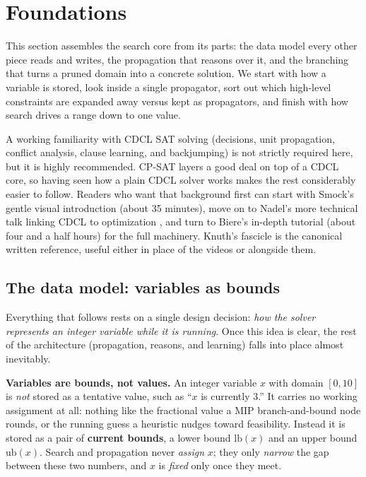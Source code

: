 \section{Foundations}\label{part:foundations}

This section assembles the search core from its parts: the data model every other
piece reads and writes, the propagation that reasons over it, and the branching
that turns a pruned domain into a concrete solution. We start with how a variable
is stored, look inside a single propagator, sort out which high-level constraints
are expanded away versus kept as propagators, and finish with how search drives a
range down to one value.

\begin{platypusbook}[htb]
A working familiarity with CDCL SAT solving (decisions, unit propagation,
conflict analysis, clause learning, and backjumping) is not strictly required
here, but it is highly recommended. CP-SAT layers a good deal on top of a CDCL
core, so having seen how a plain CDCL solver works makes the rest considerably
easier to follow. Readers who want that background first can start with Smock's
gentle visual introduction
\cite{smock2016peek} (about 35 minutes), move on to Nadel's more technical talk
linking CDCL to optimization \cite{nadel2023cdcl}, and turn to Biere's in-depth
tutorial \cite{biere2021satsolving} (about four and a half hours) for the full
machinery. Knuth's fascicle \cite{knuth2015satisfiability} is the canonical
written reference, useful either in place of the videos or alongside them.
\end{platypusbook}

\subsection{The data model: variables as bounds}\label{sec:bounds}

Everything that follows rests on a single design decision: \emph{how the solver
represents an integer variable while it is running}. Once this idea is clear,
the rest of the architecture (propagation, reasons, and learning) falls into
place almost inevitably.

\textbf{Variables are bounds, not values.} An integer variable $x$ with domain
$[0,10]$ is \emph{not} stored as a tentative value, such as ``$x$ is currently
$3$.'' It carries no working assignment at all: nothing like the fractional
value a MIP branch-and-bound node rounds, or the running guess a heuristic nudges
toward feasibility. Instead it is stored as a pair of \textbf{current bounds}, a
lower bound $\text{lb}(x)$ and an upper bound $\text{ub}(x)$. Search and
propagation never \emph{assign} $x$; they only \emph{narrow} the gap between these
two numbers, and $x$ is \emph{fixed} only once they meet.

